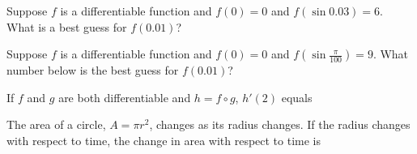 \documentclass{ximera}
\newcommand{\recommendation}[1]{}
\newcommand{\GoodQuestions}[1]{}
\begin{document}
\begin{shuffle}
\begin{problem}
  Suppose $f$ is a differentiable function and $f(0) = 0$ and
  $f(\sin 0.03) = 6$.  What is a best guess for $f(0.01)$?
  \begin{multipleChoice}
  \end{multipleChoice}
\end{problem}

\begin{problem}
  Suppose $f$ is a differentiable function and $f(0) = 0$ and
  $f(\sin \frac{\pi}{100}) = 9$.  What number below is the best guess for $f(0.01)$?
  \begin{multipleChoice}
  \end{multipleChoice}
\end{problem}



\begin{problem}
  \recommendation{Vic}

  \GoodQuestions{Subject: Derivative Rules 19Q}
  If $f$ and $g$ are both differentiable and $h=f\circ g$,
  $h'(2)$ equals
  \begin{multipleChoice}
  \end{multipleChoice}
\end{problem}


\begin{problem}
  \recommendation{Vic}

  \GoodQuestions{Subject: Derivative Rules 20P}
  The area of a circle, $A=\pi r^2$, changes as its radius changes. If
  the radius changes with respect to time, the change in area with
  respect to time is
  \begin{multipleChoice}
  \end{multipleChoice}
\end{problem}




\end{shuffle}
\end{document}
